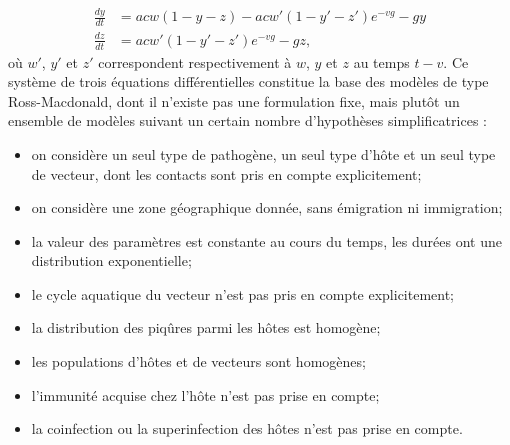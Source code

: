 \begin{align}
\frac{dy}{dt} &= acw(1-y-z) - ac{w'}(1-{y'}-{z'})e^{-vg} - gy \\
\frac{dz}{dt} &= ac{w'}(1-{y'}-{z'})e^{-vg} - gz, 
\end{align}
où ${w'}$, ${y'}$ et ${z'}$ correspondent respectivement à $w$, $y$ et $z$ au temps $t-v$.
Ce système de trois équations différentielles constitue la base des modèles de type Ross-Macdonald, dont il n'existe pas une formulation fixe, mais plutôt un ensemble de modèles suivant un certain nombre d'hypothèses simplificatrices \cite{smith2012ross} : 
\begin{itemize}
\item on considère un seul type de pathogène, un seul type d'hôte et un seul type de vecteur, dont les contacts sont pris en compte explicitement;
\item on considère une zone géographique donnée, sans émigration ni immigration;
\item la valeur des paramètres est constante au cours du temps, les durées ont une distribution exponentielle;
\item le cycle aquatique du vecteur n'est pas pris en compte explicitement;
\item la distribution des piqûres parmi les hôtes est homogène;
\item les populations d'hôtes et de vecteurs sont homogènes;
\item l'immunité acquise chez l'hôte n'est pas prise en compte;
\item la coinfection ou la superinfection des hôtes n'est pas prise en compte.
\end{itemize}

